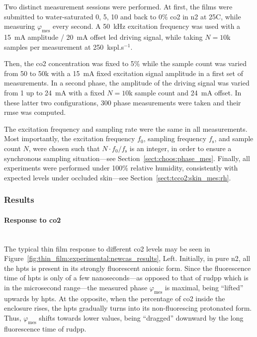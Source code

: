 Two distinct measurement sessions were performed. At first, the films were submitted to water-saturated 0, 5, 10 and back to 0\% \gls{co2} in \gls{n2} at 25{\degree}C, while measuring $\varphi_\text{mes}$ every second. A 50~kHz excitation frequency was used with a 15~mA amplitude / 20~mA offset \gls{led} driving signal, while taking $N=10$k samples per measurement at 250~kspl.s$^{-1}$.

Then, the \gls{co2} concentration was fixed to 5\% while the sample count was varied from 50 to 50k with a 15~mA fixed excitation signal amplitude in a first set of measurements. In a second phase, the amplitude of the driving signal was varied from 1 up to 24~mA with a fixed $N=10$k sample count and 24~mA offset. In these latter two configurations, 300 phase measurements were taken and their \gls{rmse} was computed.

The excitation frequency and sampling rate were the same in all measurements. Most importantly, the excitation frequency $f_0$, sampling frequency $f_\text{s}$, and sample count $N$, were chosen such that $N\cdot f_0/f_\text{s}$ is an integer, in order to ensure a synchronous sampling situation---see Section~\ref{sect:choos:phase_mes}. Finally, all experiments were performed under 100\% relative humidity, consistently with expected levels under occluded skin---see Section~\ref{sect:tcco2:skin_mes:rh}.

\subsubsection{Results}

\paragraph{Response to \gls{co2}}\mbox{}\\

The typical thin film response to different \gls{co2} levels may be seen in Figure~\ref{fig:thin_film:experimental:newcas_results}, Left. Initially, in pure \gls{n2}, all the \gls{hpts} is present in its strongly fluorescent anionic form. Since the fluorescence time of \gls{hpts} is only of a few nanoseconds---as opposed to that of \gls{rudpp} which is in the microsecond range---the measured phase $\varphi_\text{mes}$ is maximal, being \enquote{lifted} upwards by \gls{hpts}. At the opposite, when the percentage of \gls{co2} inside the enclosure rises, the \gls{hpts} gradually turns into its non-fluorescing protonated form. Thus, $\varphi_\text{mes}$ shifts towards lower values, being \enquote{dragged} downward by the long fluorescence time of \gls{rudpp}.


